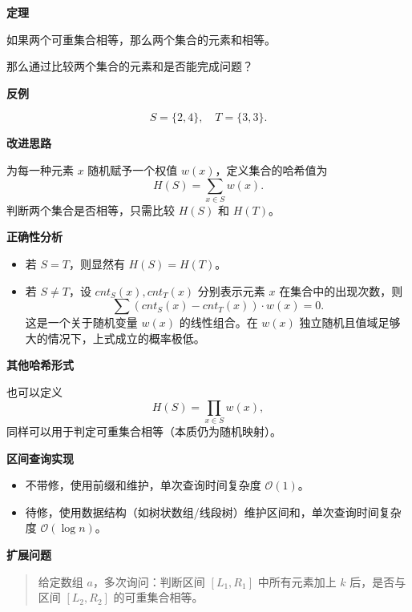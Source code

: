 \par\medskip\noindent\textbf{定理}\par\smallskip
如果两个可重集合相等，那么两个集合的元素和相等。

那么通过比较两个集合的元素和是否能完成问题？

\par\medskip\noindent\textbf{反例}\par\smallskip
\[
S=\{2,4\},\quad T=\{3,3\}.
\]

\par\medskip\noindent\textbf{改进思路}\par\smallskip
为每一种元素 $x$ 随机赋予一个权值 $w(x)$，定义集合的哈希值为
\[
H(S)=\sum_{x\in S}w(x).
\]
判断两个集合是否相等，只需比较 $H(S)$ 和 $H(T)$。

\par\medskip\noindent\textbf{正确性分析}\par\smallskip
\begin{itemize}
  \item 若 $S=T$，则显然有 $H(S)=H(T)$。
  \item 若 $S\neq T$，设 $cnt_S(x),cnt_T(x)$ 分别表示元素 $x$ 在集合中的出现次数，则
  \[
  \sum (cnt_S(x)-cnt_T(x))\cdot w(x)=0.
  \]
  这是一个关于随机变量 $w(x)$ 的线性组合。在 $w(x)$ 独立随机且值域足够大的情况下，上式成立的概率极低。
\end{itemize}

\par\medskip\noindent\textbf{其他哈希形式}\par\smallskip
也可以定义
\[
H(S)=\prod_{x\in S}w(x),
\]
同样可以用于判定可重集合相等（本质仍为随机映射）。

\par\medskip\noindent\textbf{区间查询实现}\par\smallskip
\begin{itemize}
  \item 不带修，使用前缀和维护，单次查询时间复杂度 $\mathcal{O}(1)$。
  \item 待修，使用数据结构（如树状数组/线段树）维护区间和，单次查询时间复杂度 $\mathcal{O}(\log n)$。
\end{itemize}

\par\medskip\noindent\textbf{扩展问题}\par\smallskip
\begin{quote}
给定数组 $a$，多次询问：判断区间 $[L_1,R_1]$ 中所有元素加上 $k$ 后，是否与区间 $[L_2,R_2]$ 的可重集合相等。
\end{quote}

